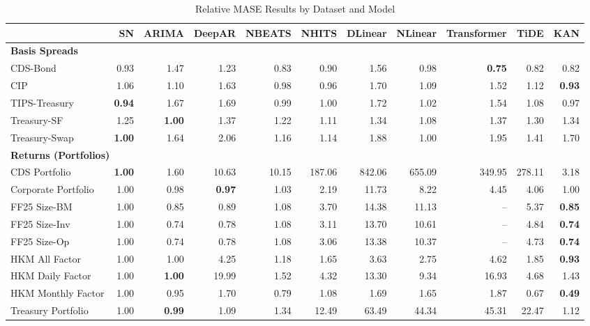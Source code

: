 
\begin{table}[htbp]
\centering
\caption{Relative MASE Results by Dataset and Model}
\label{tab:relative_mase_results}
\scriptsize
\setlength{\tabcolsep}{1.5pt}
\renewcommand{\arraystretch}{0.9}
\begin{tabular}{@{}lrrrrrrrrrr@{}}
\toprule
 & SN & ARIMA & DeepAR & NBEATS & NHITS & DLinear & NLinear & Transformer & TiDE & KAN \\
\midrule
\multicolumn{11}{l}{\textbf{Basis Spreads}} \\
CDS-Bond & 0.93 & 1.47 & 1.23 & 0.83 & 0.90 & 1.56 & 0.98 & \textbf{0.75} & 0.82 & 0.82 \\
CIP & 1.06 & 1.10 & 1.63 & 0.98 & 0.96 & 1.70 & 1.09 & 1.52 & 1.12 & \textbf{0.93} \\
TIPS-Treasury & \textbf{0.94} & 1.67 & 1.69 & 0.99 & 1.00 & 1.72 & 1.02 & 1.54 & 1.08 & 0.97 \\
Treasury-SF & 1.25 & \textbf{1.00} & 1.37 & 1.22 & 1.11 & 1.34 & 1.08 & 1.37 & 1.30 & 1.34 \\
Treasury-Swap & \textbf{1.00} & 1.64 & 2.06 & 1.16 & 1.14 & 1.88 & 1.00 & 1.95 & 1.41 & 1.70 \\
\midrule
\multicolumn{11}{l}{\textbf{Returns (Portfolios)}} \\
CDS Portfolio & \textbf{1.00} & 1.60 & 10.63 & 10.15 & 187.06 & 842.06 & 655.09 & 349.95 & 278.11 & 3.18 \\
Corporate Portfolio & 1.00 & 0.98 & \textbf{0.97} & 1.03 & 2.19 & 11.73 & 8.22 & 4.45 & 4.06 & 1.00 \\
FF25 Size-BM & 1.00 & 0.85 & 0.89 & 1.08 & 3.70 & 14.38 & 11.13 & -- & 5.37 & \textbf{0.85} \\
FF25 Size-Inv & 1.00 & 0.74 & 0.78 & 1.08 & 3.11 & 13.70 & 10.61 & -- & 4.84 & \textbf{0.74} \\
FF25 Size-Op & 1.00 & 0.74 & 0.78 & 1.08 & 3.06 & 13.38 & 10.37 & -- & 4.73 & \textbf{0.74} \\
HKM All Factor & 1.00 & 1.00 & 4.25 & 1.18 & 1.65 & 3.63 & 2.75 & 4.62 & 1.85 & \textbf{0.93} \\
HKM Daily Factor & 1.00 & \textbf{1.00} & 19.99 & 1.52 & 4.32 & 13.30 & 9.34 & 16.93 & 4.68 & 1.43 \\
HKM Monthly Factor & 1.00 & 0.95 & 1.70 & 0.79 & 1.08 & 1.69 & 1.65 & 1.87 & 0.67 & \textbf{0.49} \\
Treasury Portfolio & 1.00 & \textbf{0.99} & 1.09 & 1.34 & 12.49 & 63.49 & 44.34 & 45.31 & 22.47 & 1.12 \\

\end{tabular}
\end{table}

